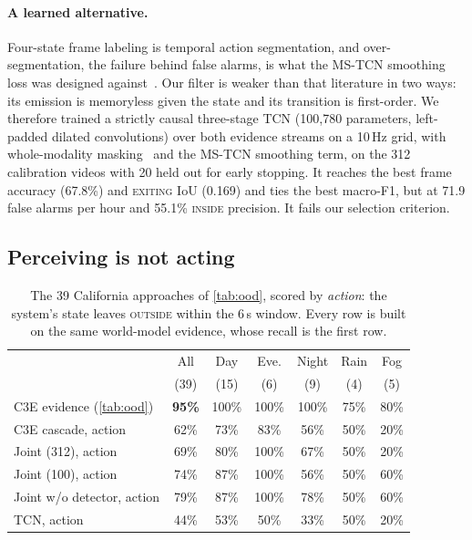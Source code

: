 \documentclass[journal]{IEEEtran}
\begin{document}
\paragraph{A learned alternative.}
Four-state frame labeling is temporal action segmentation, and over-segmentation, the failure behind false alarms, is what the MS-TCN smoothing loss was designed against~\cite{farha2019mstcn}.  Our filter is weaker than that literature in two ways: its emission is memoryless given the state and its transition is first-order.  We therefore trained a strictly causal three-stage TCN (100{,}780 parameters, left-padded dilated convolutions) over both evidence streams on a 10\,Hz grid, with whole-modality masking~\cite{neverova2016moddrop} and the MS-TCN smoothing term, on the 312 calibration videos with 20 held out for early stopping.  It reaches the best frame accuracy (67.8\%) and \textsc{exiting} IoU (0.169) and ties the best macro-F1, but at 71.9 false alarms per hour and 55.1\% \textsc{inside} precision.  It fails our selection criterion.

\subsection{Perceiving is not acting}
\label{sec:perceiveact}

\begin{table}[t]
\centering
\caption{The 39 California approaches of \cref{tab:ood}, scored by \emph{action}: the system's state leaves \textsc{outside} within the 6\,s window.  Every row is built on the same world-model evidence, whose recall is the first row.}
\label{tab:perceiveact}
\footnotesize
\setlength{\tabcolsep}{3pt}
\begin{tabular}{@{}lcccccc@{}}
\toprule
 & All & Day & Eve. & Night & Rain & Fog \\
 & (39) & (15) & (6) & (9) & (4) & (5) \\
\midrule
C3E evidence (\cref{tab:ood}) & \textbf{95\%} & 100\% & 100\% & 100\% & 75\% & 80\% \\
\midrule
C3E cascade, action           & 62\% & 73\% & 83\% & 56\% & 50\% & 20\% \\
Joint (312), action           & 69\% & 80\% & 100\% & 67\% & 50\% & 20\% \\
Joint (100), action           & 74\% & 87\% & 100\% & 56\% & 50\% & 60\% \\
Joint w/o detector, action    & 79\% & 87\% & 100\% & 78\% & 50\% & 60\% \\
TCN, action                   & 44\% & 53\% & 50\% & 33\% & 50\% & 20\% \\
\bottomrule
\end{tabular}
\end{table}
\end{document}
